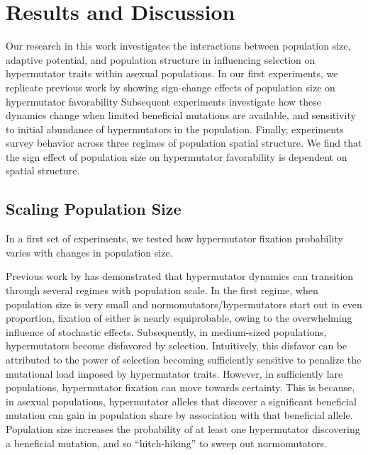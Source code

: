 \section{Results and Discussion} \label{sec:results}

Our research in this work investigates the interactions between population size, adaptive potential, and population structure in influencing selection on hypermutator traits within asexual populations.
In our first experiments, we replicate previous work by \citet{raynes2018sign} showing sign-change effects of population size on hypermutator favorability
Subsequent experiments investigate how these dynamics change when limited beneficial mutations are available, and sensitivity to initial abundance of hypermutators in the population.
Finally, experiments survey behavior across three regimes of population spatial structure.
We find that the sign effect of population size on hypermutator favorability is dependent on spatial structure.

\subsection{Scaling Population Size}
\label{sec:scaling-population-size}

In a first set of experiments, we tested how hypermutator fixation probability varies with changes in population size.

Previous work by \citet{raynes2018sign} has demonstrated that hypermutator dynamics can transition through several regimes with population scale.
In the first regime, when population size is very small and normomutators/hypermutators start out in even proportion, fixation of either is nearly equiprobable, owing to the overwhelming influence of stochastic effects.
Subsequently, in medium-sized populations, hypermutators become disfavored by selection.
Intuitively, this disfavor can be attributed to the power of selection becoming sufficiently sensitive to penalize the mutational load imposed by hypermutator traits.
However, in sufficiently lare populations, hypermutator fixation can move towards certainty.
This is because, in asexual populations, hypermutator alleles that discover a significant beneficial mutation can gain in population share by association with that beneficial allele.
Population size increases the probability of at least one hypermutator discovering a beneficial mutation, and so ``hitch-hiking'' to sweep out normomutators.



